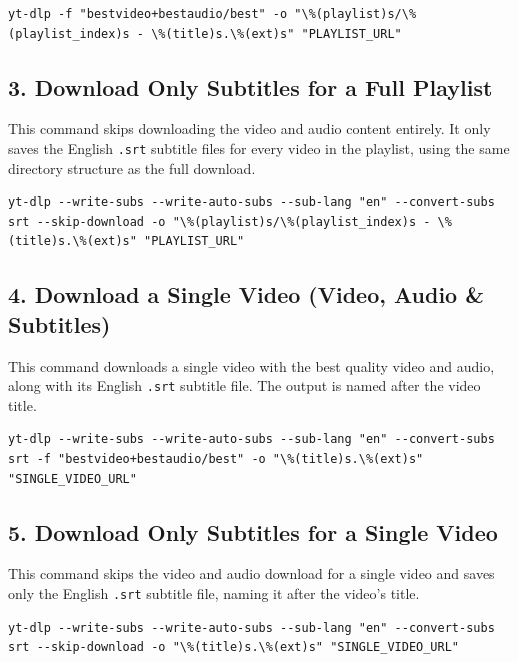 \documentclass[a4paper, 11pt]{article}
\begin{document}
\begin{lstlisting}[caption={Download full playlist without subtitles}, label={lst:playlist-no-subs}]
yt-dlp -f "bestvideo+bestaudio/best" -o "\%(playlist)s/\%(playlist_index)s - \%(title)s.\%(ext)s" "PLAYLIST_URL"
\end{lstlisting}

\subsection{3. Download Only Subtitles for a Full Playlist}
This command skips downloading the video and audio content entirely. It only saves the English \texttt{.srt} subtitle files for every video in the playlist, using the same directory structure as the full download.

\begin{lstlisting}[caption={Download only subtitles for a playlist}, label={lst:playlist-only-subs}]
yt-dlp --write-subs --write-auto-subs --sub-lang "en" --convert-subs srt --skip-download -o "\%(playlist)s/\%(playlist_index)s - \%(title)s.\%(ext)s" "PLAYLIST_URL"
\end{lstlisting}

\subsection{4. Download a Single Video (Video, Audio \& Subtitles)}
This command downloads a single video with the best quality video and audio, along with its English \texttt{.srt} subtitle file. The output is named after the video title.

\begin{lstlisting}[caption={Download a single video with subtitles}, label={lst:single-subs}]
yt-dlp --write-subs --write-auto-subs --sub-lang "en" --convert-subs srt -f "bestvideo+bestaudio/best" -o "\%(title)s.\%(ext)s" "SINGLE_VIDEO_URL"
\end{lstlisting}

\subsection{5. Download Only Subtitles for a Single Video}
This command skips the video and audio download for a single video and saves only the English \texttt{.srt} subtitle file, naming it after the video's title.

\begin{lstlisting}[caption={Download only subtitles for a single video}, label={lst:single-only-subs}]
yt-dlp --write-subs --write-auto-subs --sub-lang "en" --convert-subs srt --skip-download -o "\%(title)s.\%(ext)s" "SINGLE_VIDEO_URL"
\end{lstlisting}
\end{document}
